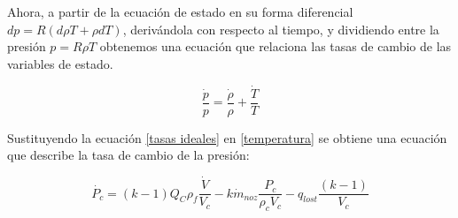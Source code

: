 \documentclass[12pt]{article}
\begin{document}
Ahora, a partir de la ecuación de estado en su forma diferencial $dp = R (d\rho T + \rho dT)$, derivándola con respecto al tiempo, y dividiendo entre la presión $p = R \rho T$ obtenemos una ecuación que relaciona las tasas de cambio de las variables de estado.

\begin{equation}
  \frac{\dot{p}}{p}=\frac{\dot{\rho}}{\rho} + \frac{\dot{T}}{T}
  \label{tasas ideales}
\end{equation}

Sustituyendo la ecuación \ref{tasas ideales} en \ref{temperatura} se obtiene una ecuación que describe la tasa de cambio de la presión:

\begin{equation}
   \dot{P_{c}}= (k-1) Q_{C} \rho_{f} \frac{\dot{V}}{V_{c}} - k \dot{m}_{noz} \frac{P_{c}}{\rho_{c} V_{c}} - q_{lost} \frac{(k-1)}{V_{c}}
  \label{temperatura}
\end{equation}

\end{document}
